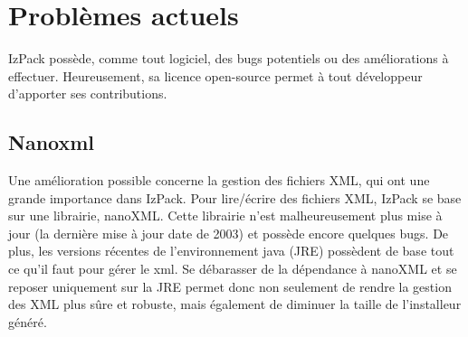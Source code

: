 \section{Problèmes actuels}
IzPack possède, comme tout logiciel, des bugs potentiels ou des améliorations à effectuer.
Heureusement, sa licence open-source permet à tout développeur d'apporter ses contributions.

\subsection{Nanoxml}
Une amélioration possible concerne la gestion des fichiers XML, qui ont une grande importance dans IzPack.
Pour lire/écrire des fichiers XML, IzPack se base sur une librairie, nanoXML. Cette librairie n'est malheureusement plus mise à jour (la dernière mise à jour date de 2003) et possède encore quelques bugs.
De plus, les versions récentes de l'environnement java (JRE) possèdent de base tout ce qu'il faut pour gérer le xml.
Se débarasser de la dépendance à nanoXML et se reposer uniquement sur la JRE permet donc non seulement de rendre la gestion des XML plus sûre et robuste, mais également de diminuer la taille de l'installeur généré.
